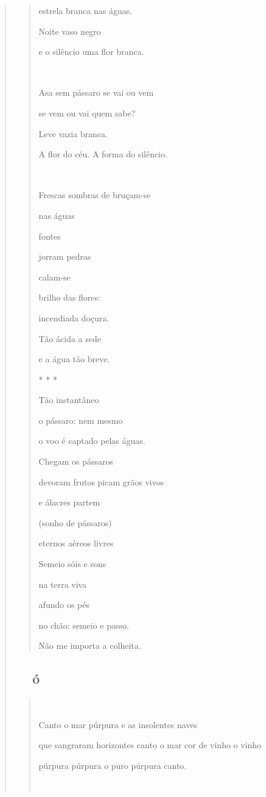 \begin{verse}
\begin{quote}
estrela branca nas águas.

Noite vaso negro

e o silêncio uma flor branca.



Asa sem pássaro se vai ou vem

se vem ou vai quem sabe?

Leve vazia branca.

A flor do céu. A forma do silêncio.



Frescas sombras de bruçam-se

nas águas

fontes

jorram pedras

calam-se

brilho das flores:

incendiada doçura.

Tão ácida a sede

e a água tão breve.

* * *

Tão instantâneo

o pássaro: nem mesmo

o voo é captado pelas águas.

Chegam os pássaros

devoram frutos picam grãos vivos

e álacres partem

(sonho de pássaros)

eternos aéreos livres

Semeio sóis e sons

na terra viva

afundo os pés

no chão: semeio e passo.

Não me importa a colheita.
\end{quote}

\subsection{ó}\label{section-7}

\begin{quote}


Canto o mar púrpura e as insolentes naves

que sangraram horizontes canto o mar cor de vinho o vinho

púrpura púrpura o puro púrpura canto.




\end{quote}
\end{verse}
